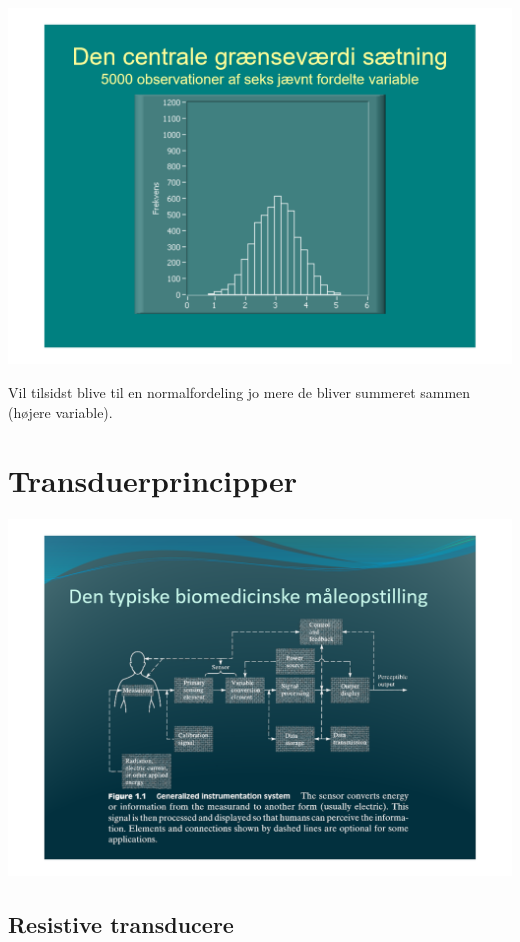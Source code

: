 \documentclass[12pt, letterpaper]{article}
\begin{document}
\begin{center}
\includegraphics[width=\textwidth]{billeder/billede26}
\end{center}
Vil tilsidst blive til en normalfordeling jo mere de bliver summeret sammen (højere variable). 




\section{Transduerprincipper}

\begin{center}
\includegraphics[width=\textwidth]{billeder/billede27}
\end{center}

\subsection{Resistive transducere}
\end{document}
